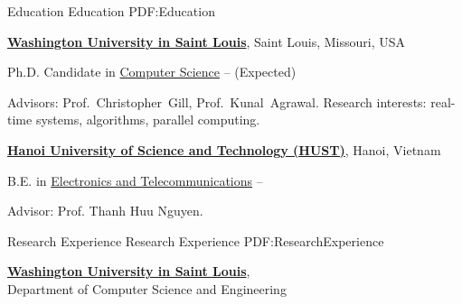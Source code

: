 \documentclass[letterpaper,MMMyyyy,nonstopmode]{simpleresumecv}
\begin{document}
\begin{Body}


\Section
{Education}
{Education}
{PDF:Education}

\Entry
\href{https://wustl.edu}
{\textbf{Washington University in Saint Louis}},
Saint Louis, Missouri, USA

\Gap
\BulletItem
Ph.D. Candidate in
\href{https://cse.wustl.edu/Pages/default.aspx}
{Computer Science}
\hfill
{} --  (Expected)
\begin{Detail}
\SubBulletItem
Advisors:
Prof.~Christopher~Gill, Prof.~Kunal~Agrawal.
\SubBulletItem
Research interests: real-time systems, algorithms, parallel computing.
\end{Detail}



\BigGap
\Entry
\href{https://en.hust.edu.vn/home}
{\textbf{Hanoi University of Science and Technology (HUST)}},
Hanoi, Vietnam

\Gap
\BulletItem
B.E. in
\href{http://set.hust.edu.vn/index.php/en}
{Electronics and Telecommunications}
\hfill
{} --
\begin{Detail}
\SubBulletItem
Advisor: Prof. Thanh Huu Nguyen.
\end{Detail}


\Section
{Research Experience}
{Research Experience}
{PDF:ResearchExperience}

\Entry
\href{https://cse.wustl.edu/Pages/default.aspx}
{\textbf{Washington University in Saint Louis}}, \\
Department of Computer Science and Engineering


\end{Body}
\end{document}
